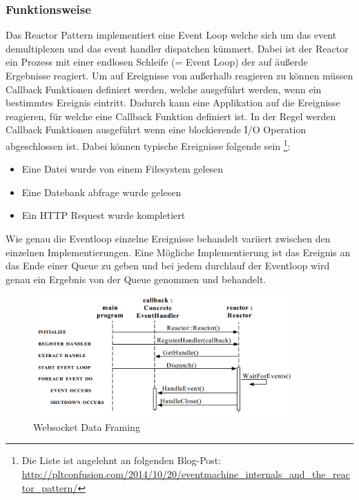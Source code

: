 \subsubsection{Funktionsweise}

Das Reactor Pattern implementiert eine Event Loop welche sich um das event demultiplexen und das event handler dispatchen kümmert. Dabei ist der Reactor ein Prozess mit einer endlosen Schleife (= Event Loop) der auf äußerde Ergebnisse reagiert. Um auf Ereignisse von außerhalb reagieren zu können müssen Callback Funktionen definiert werden, welche ausgeführt werden, wenn ein bestimmtes Ereignis eintritt. Dadurch kann eine Applikation auf die Ereignisse reagieren, für welche eine Callback Funktion definiert ist. In der Regel werden Callback Funktionen ausgeführt wenn eine blockierende I/O Operation abgeschlossen ist. Dabei können typische Ereignisse folgende sein \footnote{Die Liste ist angelehnt an folgenden Blog-Post: \url{http://pltconfusion.com/2014/10/20/eventmachine_internals_and_the_reactor_pattern/}}:

\begin{itemize}
  \item Eine Datei wurde von einem Filesystem gelesen
  \item Eine Datebank abfrage wurde gelesen
  \item Ein HTTP Request wurde kompletiert
\end{itemize}

Wie genau die Eventloop einzelne Ereignisse behandelt variiert zwischen den einzelnen Implementierungen. Eine Mögliche Implementierung ist das Ereignis an das Ende einer Queue zu geben und bei jedem durchlauf der Eventloop wird genau ein Ergebnis von der Queue genommen und behandelt. 

\begin{figure}[!htb]
  \centering
  \includegraphics[width=10cm]{images/reactor.png}
  \caption{
    Websocket Data Framing \cite[p. 5]{Sch95}
  }
  \label{figure:WSDataFraming}
\end{figure}








